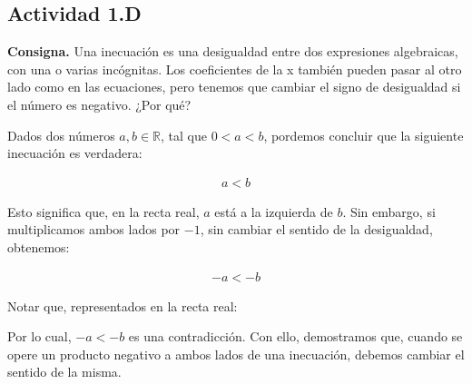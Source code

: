 \subsection*{Actividad 1.D}
\textbf{Consigna. }
Una inecuación es una desigualdad entre dos expresiones algebraicas,
con una o varias incógnitas.
Los coeficientes de la x también pueden pasar al otro lado como en
las ecuaciones, pero tenemos que cambiar el signo de
desigualdad si el número es negativo.
¿Por qué?

Dados dos números $a, b \in \mathbb{R}$,
tal que \(0 < a < b\),
pordemos concluir que la siguiente inecuación es verdadera:

\begin{align*}
	a < b
\end{align*}

Esto significa que,
en la recta real, \(a\) está a la izquierda de \(b\).
Sin embargo,
si multiplicamos ambos lados por \(-1\),
sin cambiar el sentido de la desigualdad, obtenemos:

\begin{align*}
	-a < -b
\end{align*}

Notar que,
representados en la recta real:

\begin{center}
	\vspace{15pt}
	\vspace{15pt}
\end{center}

Por lo cual, \(-a < -b\) es una contradicción.
Con ello, demostramos que,
cuando se opere un producto negativo a ambos lados de una inecuación,
debemos cambiar el sentido de la misma.
